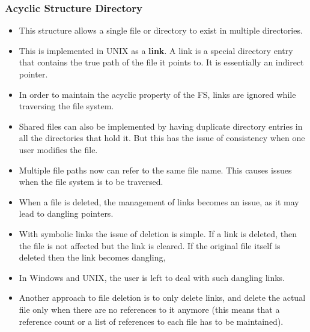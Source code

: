 \documentclass{article}
\theoremstyle{plain}
\theoremstyle{definition}
\begin{document}
\subsubsection{Acyclic Structure Directory}
\begin{itemize}
    \item This structure allows a single file or directory to exist in multiple directories. 
    
    \item This is implemented in UNIX as a \textbf{link}. A link is a special directory entry that contains the true path of the file it points to. It is essentially an indirect pointer. 
    
    \item In order to maintain the acyclic property of the FS, links are ignored while traversing the file system. 
    
    \item Shared files can also be implemented by having duplicate directory entries in all the directories that hold it. But this has the issue of consistency when one user modifies the file. 
    
    \item  Multiple file paths now can refer to the same file name. This causes issues when the file system is to be traversed. 
    
    \item When a file is deleted, the management of links becomes an issue, as it may lead to dangling pointers. 
    
    \item With symbolic links the issue of deletion is simple. If a link is deleted, then the file is not affected but the link is cleared. If the original file itself is deleted then the link becomes dangling, 
    
    \item In Windows and UNIX, the user is left to deal with such dangling links. 
    
    \item Another approach to file deletion is to only delete links, and delete the actual file only when there are no references to it anymore (this means that a reference count or a list of references to each file has to be maintained). 
    
\end{itemize}
\end{document}
